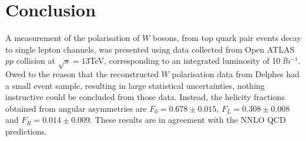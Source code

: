 \documentclass[12pt,a4paper]{article}
\numberwithin{equation}{section}
\begin{document}

\section{Conclusion}
A measurement of the polarisation of $W$ bosons, from top quark pair events
decay to single lepton channels, was presented using data collected from Open
ATLAS $pp$ collision at $\sqrt s = 13$TeV, corresponding to an integrated
luminosity of 10 fb$^{-1}$. Owed to the reason that the reconstructed $W$
polarisation data from Delphes had a small event sample, resulting in large
statistical uncertainties, nothing instructive could be concluded from those
data. Instead, the helicity fractions obtained from angular asymmetries are
$F_0=0.678 \pm 0.015$, $F_L=0.308 \pm 0.008$ and $F_R=0.014 \pm 0.009$. These
results are in agreement with the NNLO QCD predictions.


\printbibliography
\end{document}
